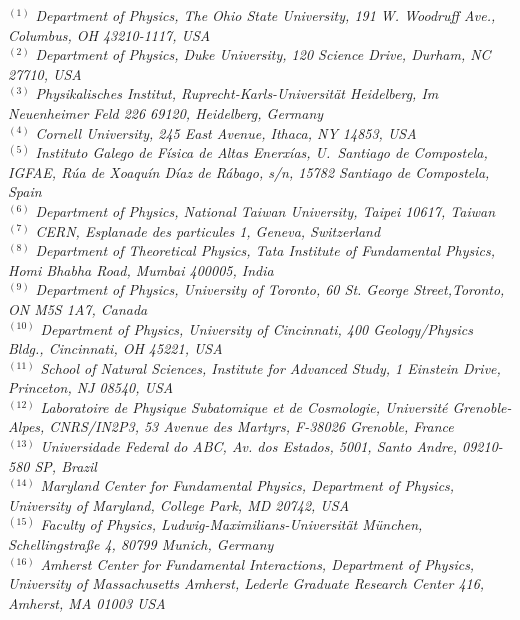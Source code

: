 {\footnotesize
\begin{center}
$^{(1)}$ \emph{Department of Physics, The Ohio State University, 191 W. Woodruff Ave., Columbus, OH 43210-1117, USA}\\
$^{(2)}$ \emph{Department of Physics, Duke University, 120 Science Drive, Durham, NC 27710, USA}\\
$^{(3)}$ \emph{Physikalisches Institut, Ruprecht-Karls-Universit\"at Heidelberg, Im Neuenheimer Feld 226 69120, Heidelberg, Germany}\\
$^{(4)}$ \emph{Cornell University, 245 East Avenue, Ithaca, NY 14853, USA}\\
$^{(5)}$ \emph{Instituto Galego de F\'isica de Altas Enerx\'ias, U.~Santiago de Compostela, IGFAE, R\'ua de Xoaqu\'in D\'iaz de R\'abago, s/n, 15782 Santiago de Compostela, Spain}\\
$^{(6)}$ \emph{Department of Physics, National Taiwan University, Taipei 10617, Taiwan}\\
$^{(7)}$ \emph{CERN, Esplanade des particules 1, Geneva,  Switzerland}\\
$^{(8)}$ \emph{Department of Theoretical Physics, Tata Institute of Fundamental Physics,  Homi Bhabha Road, Mumbai 400005, India}\\
$^{(9)}$ \emph{Department of Physics, University of Toronto, 60 St. George Street,Toronto, ON M5S 1A7, Canada}\\
$^{(10)}$ \emph{Department of Physics, University of Cincinnati, 400 Geology/Physics Bldg., Cincinnati, OH 45221, USA}\\
$^{(11)}$ \emph{School of Natural Sciences, Institute for Advanced Study, 1 Einstein Drive, Princeton, NJ 08540, USA}\\
$^{(12)}$ \emph{Laboratoire de Physique Subatomique et de Cosmologie, Universit\'e   Grenoble-Alpes, CNRS/IN2P3, 53 Avenue des Martyrs, F-38026 Grenoble, France}\\
$^{(13)}$ \emph{Universidade Federal do ABC, Av. dos Estados, 5001, Santo Andre, 09210-580 SP, Brazil}\\
$^{(14)}$ \emph{Maryland Center for Fundamental Physics,  Department of Physics, University of Maryland, College Park, MD 20742, USA}\\
$^{(15)}$ \emph{Faculty of Physics, Ludwig-Maximilians-Universit\"at M\"unchen, Schellingstra\ss e 4, 80799 Munich, Germany}\\
$^{(16)}$ \emph{Amherst Center for Fundamental Interactions, Department of Physics, University of Massachusetts Amherst, Lederle Graduate Research Center 416, Amherst, MA 01003 USA}\\

\end{center}}
